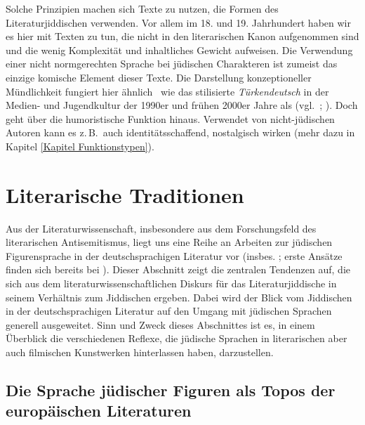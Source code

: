  Solche Prinzipien machen sich Texte zu nutzen, die Formen des Literaturjiddischen verwenden. Vor allem im 18. und 19. Jahrhundert haben wir es hier mit Texten zu tun, die nicht in den literarischen Kanon aufgenommen sind und die wenig Komplexität und inhaltliches Gewicht aufweisen. Die Verwendung einer nicht normgerechten Sprache bei jüdischen Charakteren ist zumeist das einzige komische Element dieser Texte. Die Darstellung konzeptioneller Mündlichkeit fungiert hier ähnlich \,%
 wie das stilisierte \textit{Türkendeutsch} in der Medien- und Jugendkultur der 1990er und frühen 2000er Jahre als  (vgl.\, \citealt[59]{Deppermann2007}; \citealt{Auer2003}). Doch  geht über die humoristische Funktion hinaus. Verwendet von nicht-jüdischen Autoren kann es z.\,B.\, auch identitätsschaffend, nostalgisch wirken (mehr dazu in Kapitel \ref{Kapitel Funktionstypen}).


\chapter{Literarische Traditionen}\label{lijiliteraturwissenschaft}


\largerpage

\noindent Aus der Literaturwissenschaft, insbesondere aus dem Forschungsfeld des literarischen Antisemitismus, liegt uns eine Reihe an Arbeiten zur jüdischen Figurensprache in der deutschsprachigen Literatur vor (insbes. \citealt{FischerBayerd2008,Kremer2007,Schreuder2002,Krobb2000,Glasenapp1999,Gubser1998,Groezinger1998,Richter1995,Och1995,Frey1994,Frey1992,Althaus1981,Althaus1986,Gelber1986,Denkler1977,Jenzsch1974}; erste Ansätze finden sich bereits bei \citealt{Carrington1897}). Dieser Abschnitt zeigt die zentralen Tendenzen auf, die sich aus dem literaturwissenschaftlichen Diskurs für das Literaturjiddische in seinem Verhältnis zum Jiddischen ergeben. Dabei wird der Blick vom Jiddischen in der deutschsprachigen Literatur auf den Umgang mit jüdischen Sprachen generell ausgeweitet. Sinn und Zweck dieses Abschnittes ist es, in einem Überblick die verschiedenen Reflexe, die jüdische Sprachen in literarischen aber auch filmischen Kunstwerken hinterlassen haben, darzustellen.  


\section{Die Sprache jüdischer Figuren als Topos der europäischen Literaturen}\label{euroliji}
 
